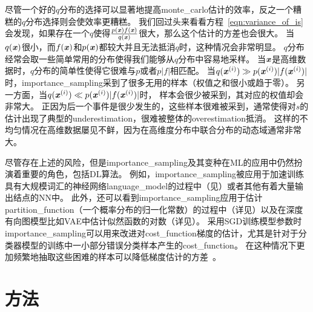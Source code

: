 尽管一个好的$q$分布的选择可以显著地提高\gls{monte_carlo}估计的效率，反之一个糟糕的$q$分布选择则会使效率更糟糕。
我们回过头来看看方程~\eqref{eqn:variance_of_is}会发现，如果存在一个$q$使得$\frac{p(\boldsymbol{\mathit{x}})f(\boldsymbol{\mathit{x}})}{q(\boldsymbol{\mathit{x}})}$很大，那么这个估计的方差也会很大。
当$q(\boldsymbol{\mathit{x}})$很小，而$f(\boldsymbol{\mathit{x}})$和$p(\boldsymbol{\mathit{x}})$都较大并且无法抵消$q$时，这种情况会非常明显。
$q$分布经常会取一些简单常用的分布使得我们能够从$q$分布中容易地采样。
当$\boldsymbol{\mathit{x}}$是高维数据时，$q$分布的简单性使得它很难与$p$或者$p\vert f\vert$相匹配。   
当$q(\boldsymbol{\mathit{x}}^{(i)})\gg p(\boldsymbol{\mathit{x}}^{(i)}) \vert f(\boldsymbol{\mathit{x}}^{(i)})\vert $时，\gls{importance_sampling}采到了很多无用的样本（权值之和很小或趋于零）。
另一方面，当$q(\boldsymbol{\mathit{x}}^{(i)})\ll p(\boldsymbol{\mathit{x}}^{(i)}) \vert f(\boldsymbol{\mathit{x}}^{(i)})\vert $时， 样本会很少被采到，其对应的权值却会非常大。
正因为后一个事件是很少发生的，这些样本很难被采到，通常使得对$s$的估计出现了典型的\gls{underestimation}，很难被整体的\gls{overestimation}抵消。
这样的不均匀情况在高维数据屡见不鲜，因为在高维度分布中联合分布的动态域通常非常大。


尽管存在上述的风险，但是\gls{importance_sampling}及其变种在\gls{ML}的应用中仍然扮演着重要的角色，包括\gls{DL}算法。
例如，\gls{importance_sampling}被应用于加速训练具有大规模词汇的神经网络\gls{language_model}的过程中（见）或者其他有着大量输出结点的\gls{NN}中。   
此外，还可以看到\gls{importance_sampling}应用于估计\gls{partition_function}（一个概率分布的归一化常数）的过程中（详见）以及在深度有向图模型比如\gls{VAE}中估计似然函数的对数（详见）。
采用\gls{SGD}训练模型参数时\gls{importance_sampling}可以用来改进对\gls{cost_function}梯度的估计，尤其是针对于分类器模型的训练中一小部分错误分类样本产生的\gls{cost_function}。    %
在这种情况下更加频繁地抽取这些困难的样本可以降低梯度估计的方差~\citep{Hinton06}。 %


\section{方法}
\label{sec:markov_chain_monte_carlo_methods}

